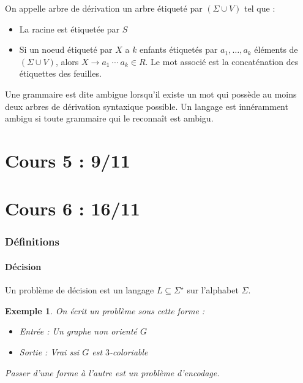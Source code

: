 \documentclass{cours}
\newtheorem{example}{Exemple}[section]
\begin{document}
\begin{definition}
    On appelle arbre de dérivation un arbre étiqueté par $\left(\Sigma \cup V\right)$ tel que : 
    \begin{itemize}
        \item La racine est étiquetée par $S$
        \item Si un noeud étiqueté par $X$ a $k$ enfants étiquetés par $a_{1}, \ldots, a_{k}$ éléments de $\left(\Sigma \cup V\right)$, alors $X \rightarrow a_{1}\ \cdots \ a_{k} \in R$. Le mot associé est la concaténation des étiquettes des feuilles. 
    \end{itemize}
    
    Une grammaire est dite ambigue lorsqu'il existe un mot qui possède au moins deux arbres de dérivation syntaxique possible. Un langage est innéramment ambigu si toute grammaire qui le reconnaît est ambigu. 
\end{definition}

\part[Automates à Pile]{Cours 5 : 9/11}



\part[Machines de Turing]{Cours 6 : 16/11}
\section{Définitions}
\subsection{Décision}
\begin{definition}
    Un problème de décision est un langage $L \subseteq \Sigma^{\star}$ sur l'alphabet $\Sigma$.
\end{definition}
\begin{example} 
    On écrit un problème sous cette forme : 
    \begin{itemize}
        \item Entrée : Un graphe non orienté $G$
        \item Sortie : Vrai ssi $G$ est $3$-coloriable
    \end{itemize}
    Passer d'une forme à l'autre est un problème d'encodage.
\end{example}
\end{document}
